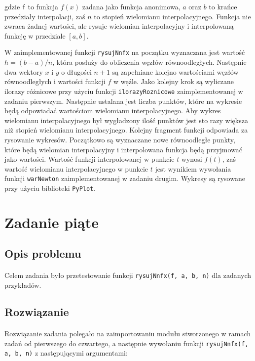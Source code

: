 \documentclass[a4paper]{article}
\theoremstyle{plain}
\begin{document}
gdzie \texttt{f} to funkcja $f(x)$ zadana jako funkcja anonimowa, $a$ oraz $b$ to krańce przedziały interpolacji, zaś $n$ to stopień wielomianu interpolacyjnego. Funkcja nie zwraca żadnej wartości, ale rysuje wielomian interpolacyjny i interpolowaną funkcję w przedziale $[a, b]$.

W zaimplementowanej funkcji \texttt{rysujNnfx} na początku wyznaczana jest wartość $h = (b - a) / n$, która posłuży do obliczenia węzłów równoodległych. Następnie dwa wektory $x$ i $y$ o długości $n + 1$ są zapełniane kolejno wartościami węzłów równoodległych i wartości funkcji $f$ w węźle. Jako kolejny krok są wyliczane ilorazy różnicowe przy użyciu funkcji \texttt{ilorazyRoznicowe} zaimplementowanej w zadaniu pierwszym. Następnie ustalana jest liczba punktów, które na wykresie będą odpowiadać wartościom wielomianu interpolacyjnego. Aby wykres wielomianu interpolacyjnego był wygładzony ilość punktów jest sto razy większa niż stopień wielomianu interpolacyjnego. Kolejny fragment funkcji odpowiada za rysowanie wykresów. Początkowo są wyznaczane nowe równoodległe punkty, które będą wielomian interpolacyjny i interpolowana funkcja będą przyjmować jako wartości. Wartość funkcji interpolowanej w punkcie $t$ wynosi $f(t)$, zaś wartość wielomianu interpolacyjnego w punkcie $t$ jest wynikiem wywołania funkcji \texttt{warNewton} zaimplementowanej w zadaniu drugim. Wykresy są rysowane przy użyciu biblioteki \texttt{PyPlot}. 

\section{Zadanie piąte}

\subsection{Opis problemu}
\paragraph{}
Celem zadania było przetestowanie funkcji \texttt{rysujNnfx(f, a, b, n)} dla zadanych przykładów.

\subsection{Rozwiązanie}
\paragraph{}
Rozwiązanie zadania polegało na zaimportowaniu modułu stworzonego w ramach zadań od pierwszego do czwartego, a następnie wywołaniu funkcji \texttt{rysujNnfx(f, a, b, n)} z następującymi argumentami:
\end{document}
